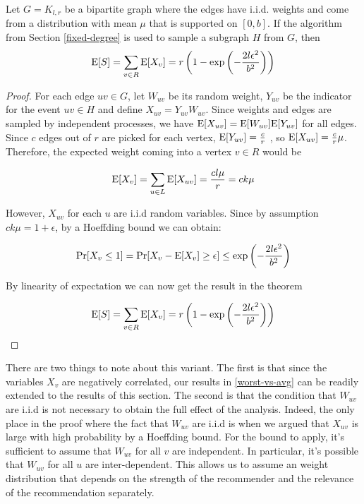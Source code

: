 \begin{thm}
Let $G=K_{l,r}$ be a bipartite graph where the edges have i.i.d. weights and come from a distribution with mean $\mu$ that is supported on $[0,b]$. If the algorithm from Section \ref{fixed-degree} is used to sample a subgraph $H$ from $G$, then
\[ \text{E}[S] = \sum_{v\in R} \text{E}[X_v] = r\left(1-\exp\left(-\frac{2l\epsilon^2}{b^2}\right)\right) \]
\end{thm}

\begin{proof}
For each edge $uv\in G$, let $W_{uv}$ be its random weight, $Y_{uv}$ be
the indicator for the event $uv\in H$ and define $X_{uv} = Y_{uv}
W_{uv}$. Since weights and edges are sampled by independent processes,
we have $\text{E}[X_{uv}] = \text{E}[W_{uv}]\text{E}[Y_{uv}]$ for all edges. Since $c$
edges out of $r$ are picked for each vertex, $\text{E}[Y_{uv}] = \frac{c}{r}$
, so $\text{E}[X_{uv}] = \frac{c}{r}\mu$. Therefore, the expected weight
coming into a vertex $v\in R$ would be 

\[ \text{E}[X_v] = \sum_{u\in L} \text{E}[X_{uv}] = \frac{cl\mu}{r} = ck\mu\]

However, $X_{uv}$ for each $u$ are i.i.d random variables. Since by
assumption $ck\mu = 1+\epsilon$, by a Hoeffding bound we can obtain:

\[ \Pr[X_v \leq 1] = \Pr[X_v - \text{E}[X_v] \geq \epsilon] \leq \exp\left(-\frac{2l\epsilon^2}{b^2}\right) \]

By linearity of expectation we can now get the result in the theorem

\[ \text{E}[S] = \sum_{v\in R} \text{E}[X_v] = r\left(1-\exp\left(-\frac{2l\epsilon^2}{b^2}\right)\right) \]
\end{proof}

There are two things to note about this variant. The first is that
since the variables $X_v$ are negatively correlated, our results in
\ref{worst-vs-avg} can be readily extended to the results of this
section. The second is that the condition that $W_{uv}$ are i.i.d
is not necessary to obtain the full effect of the analysis. Indeed,
the only place in the proof where the fact that $W_{uv}$ are i.i.d
is when we argued that $X_{uv}$ is large with high probability by a
Hoeffding bound. For the bound to apply, it's sufficient to assume
that $W_{uv}$ for all $v$ are independent. In particular, it's 
possible that $W_{uv}$ for all $u$ are inter-dependent. This allows
us to assume an weight distribution that depends on the strength of 
the recommender and the relevance of the recommendation separately.
